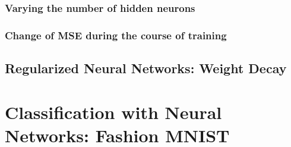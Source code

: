 \documentclass{article}
\begin{document}
\subsubsection{Varying the number of hidden neurons}


\subsubsection{Change of MSE during the course of training}

\clearpage
\subsection{Regularized Neural Networks: Weight Decay}

\newpage

\clearpage
\section{Classification with Neural Networks: Fashion MNIST}
\end{document}
